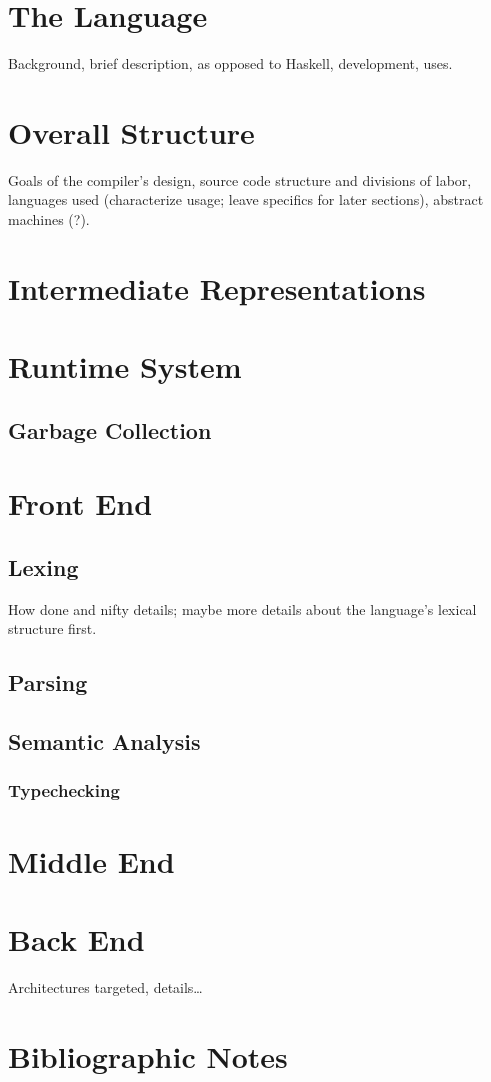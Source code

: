 \label{functional:smlnj}
\section{The Language}
Background, brief description, as opposed to Haskell, development, uses.

\section{Overall Structure}
Goals of the compiler's design, source code structure and divisions of labor, languages used (characterize usage; leave specifics for later sections), abstract machines (?).

\section{Intermediate Representations}

\section{Runtime System}

\subsection{Garbage Collection}

\section{Front End}
\subsection{Lexing}
How done and nifty details; maybe more details about the language's lexical structure first.

\subsection{Parsing}

\subsection{Semantic Analysis}

\subsubsection{Typechecking}

\section{Middle End}

\section{Back End}
Architectures targeted, details\dots

\section{Bibliographic Notes}